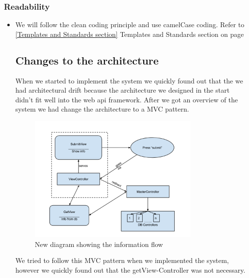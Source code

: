 \subsubsection{Readability}
\begin{itemize}
\item We will follow the clean coding principle and use camelCase coding. Refer to \ref{Templates and Standards section} Templates and Standards section on page \pageref{Templates and Standards section}

\subsection{Changes to the architecture}
When we started to implement the system we quickly found out that the we had architectural drift because the architecture we designed in the start didn't fit well into the web api framework. After we got an overview of the system we had change the architecture to a MVC pattern. 
\begin{figure}[H]
\centering
\includegraphics[width=0.8\textwidth]{images/architecture03_revised1.png}
\caption{New diagram showing the information flow}
\label{fig:info_flow}
\end{figure}
We tried to follow this MVC pattern when we implemented the system, however we quickly found out that the getView-Controller was not necessary.


\end{itemize}
